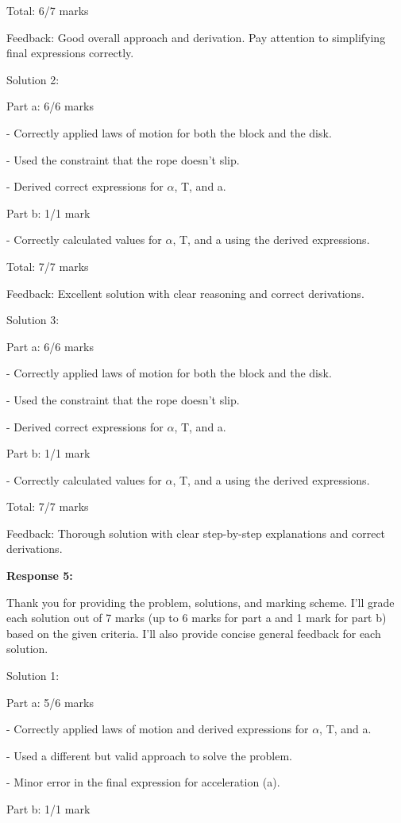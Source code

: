 \documentclass[a4paper,11pt]{article}
\begin{document}
Total: 6/7 marks

Feedback: Good overall approach and derivation. Pay attention to simplifying final expressions correctly.

Solution 2:

Part a: 6/6 marks

- Correctly applied laws of motion for both the block and the disk.

- Used the constraint that the rope doesn't slip.

- Derived correct expressions for \(\alpha\), T, and a.

Part b: 1/1 mark

- Correctly calculated values for \(\alpha\), T, and a using the derived expressions.

Total: 7/7 marks

Feedback: Excellent solution with clear reasoning and correct derivations.

Solution 3:

Part a: 6/6 marks

- Correctly applied laws of motion for both the block and the disk.

- Used the constraint that the rope doesn't slip.

- Derived correct expressions for \(\alpha\), T, and a.

Part b: 1/1 mark

- Correctly calculated values for \(\alpha\), T, and a using the derived expressions.

Total: 7/7 marks

Feedback: Thorough solution with clear step-by-step explanations and correct derivations.

\bigskip
\textbf{Response 5:}

Thank you for providing the problem, solutions, and marking scheme. I'll grade each solution out of 7 marks (up to 6 marks for part a and 1 mark for part b) based on the given criteria. I'll also provide concise general feedback for each solution.

Solution 1:

Part a: 5/6 marks

- Correctly applied laws of motion and derived expressions for \(\alpha\), T, and a.

- Used a different but valid approach to solve the problem.

- Minor error in the final expression for acceleration (a).

Part b: 1/1 mark
\end{document}
